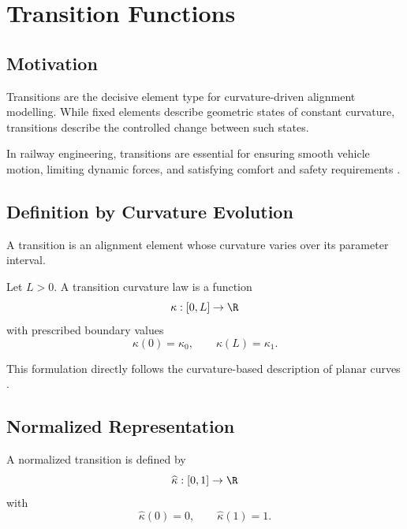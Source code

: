 \chapter{Transition Functions}

\section{Motivation}

\begin{remark}
Transitions are the decisive element type for curvature-driven alignment
modelling. While fixed elements describe geometric states of constant
curvature, transitions describe the controlled change between such states.
\end{remark}

\begin{remark}
In railway engineering, transitions are essential for ensuring smooth
vehicle motion, limiting dynamic forces, and satisfying comfort and
safety requirements \cite{Koc2008TransitionCurves,Review2020TransitionCurves}.
\end{remark}

\section{Definition by Curvature Evolution}

\begin{definition}[Transition]
A transition is an alignment element whose curvature varies over its
parameter interval.
\end{definition}

\begin{definition}
Let $L>0$. A transition curvature law is a function
\[
\kappa : [0,L] \to \R
\]
with prescribed boundary values
\[
\kappa(0)=\kappa_0,
\qquad
\kappa(L)=\kappa_1.
\]
\end{definition}

\begin{remark}
This formulation directly follows the curvature-based description of
planar curves \cite{DoCarmo1976Curves}.
\end{remark}

\section{Normalized Representation}

\begin{definition}
A normalized transition is defined by
\[
\widehat{\kappa} : [0,1] \to \R
\]
with
\[
\widehat{\kappa}(0)=0,
\qquad
\widehat{\kappa}(1)=1.
\]
\end{definition}

